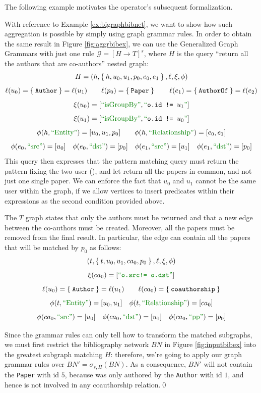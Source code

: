 The following example 
motivates the operator's subsequent formalization.


\begin{example}[label=ex:firstforgrammars]
	With reference to Example \vref{ex:bigraphbibnet}, we want to show how such aggregation is possible by simply using graph grammar rules.	In order to obtain the same result in Figure \vref{fig:aggrbibex}, we can use the Generalized Graph Grammars with just one rule $\mathcal{G}=[H\to T]^s$, where $H$ is the query ``return all the authors that are co-authors'' nested graph:
	\[H=(h,\Set{h,u_0,u_1,p_0,e_0,e_1},\ell,\xi,\phi)\]
	\[\ell(u_0)=\Set{\texttt{Author}}=\ell(u_1)\qquad \ell(p_0)=\Set{\texttt{Paper}}\qquad \ell(e_1)=\Set{\texttt{AuthorOf}}=\ell(e_2)\]
	\[\xi(u_0)=[\mstr{isGroupBy},\textup{\color{webgreen}``}\texttt{o.id != }u_1\textup{\color{webgreen}''}]\]
	\[\xi(u_1)=[\mstr{isGroupBy},\textup{\color{webgreen}``}\texttt{o.id != }u_0\textup{\color{webgreen}''}]\]
	\[\phi(h,\ONTA)=[u_0, u_1, p_0]\qquad \phi(h,\RELA)=[e_0, e_1]\]
	\[\phi(e_0,\SRC)=[u_0]\quad \phi(e_0,\DST)=[p_0]\quad \phi(e_1,\SRC)=[u_1]\quad \phi(e_1,\DST)=[p_0]\]
	This query then expresses that the pattern matching query must return the pattern fixing the two user (), and let return all the papers in common, and not just one single paper. We can enforce the fact that $u_0$ and $u_1$ cannot be the same user within the graph, if we allow vertices to insert predicates within their expressions as the second condition provided above.
	
	 The $T$ graph states that only the authors must be returned and that a new edge between the co-authors must be created. Moreover, all the papers must be removed from the final result. In particular, the edge can contain all the papers that will be matched by $p_0$ as follows:
	\[(t,\Set{t,u_0,u_1,ca_0,p_0},\ell,\xi,\phi)\]
	\[\xi(ca_0)=[{\color{webgreen}\textup{``}\texttt{o.src!= o.dst}\textup{''}}]\]
	\[\ell(u_0)=\Set{\texttt{Author}}=\ell(u_1)\qquad \ell(ca_0)=\Set{\texttt{coauthorship}}\]
	\[\phi(t,\ONTA)=[u_0,u_1]\quad \phi(t,\RELA)=[ca_0]\]
	\[\phi(ca_0,\SRC)=[u_0]\quad \phi(ca_0,\DST)=[u_1]\quad \phi(ca_0,\mstr{pp})=[p_0]\]
	
	Since the grammar rules can only tell how to transform the matched subgraphs, we must first restrict the bibliography network $BN$ in Figure \vref{fig:inputbibex} into the greatest subgraph matching $H$: therefore, we're going to apply our graph grammar rules over $BN'=\sigma_{s,H}(BN)$. As a consequence, $BN'$ will not contain the \texttt{Paper} with id $5$, because was only authored by the \texttt{Author} with id $1$, and hence is not involved in any coauthorship relation.\qed
\end{example}


